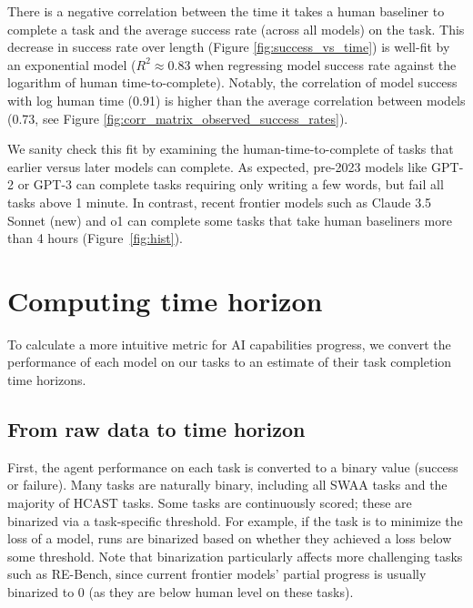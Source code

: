 \documentclass{article}
\newcommand{\gabenchmark}{HCAST}
\begin{document}
There is a negative correlation between the time it takes a human baseliner to complete a task and the average success rate (across all models) on the task. This decrease in success rate over length (Figure \ref{fig:success_vs_time}) is well-fit by an exponential model ($R^2 \approx 0.83$ when regressing model success rate against the logarithm of human time-to-complete). Notably, the correlation of model success with log human time (0.91) is higher than the average correlation between models (0.73, see Figure \ref{fig:corr_matrix_observed_success_rates}). 

We sanity check this fit by examining the human-time-to-complete of tasks that earlier versus later models can complete. As expected, pre-2023 models like GPT-2 or GPT-3 can complete tasks requiring only writing a few words, but fail all tasks above 1 minute. In contrast, recent frontier models such as Claude 3.5 Sonnet (new) and o1 can complete some tasks that take human baseliners more than 4 hours (Figure~\ref{fig:hist}). 



\section{Computing time horizon} \label{sec:converting-to-horizon}
To calculate a more intuitive metric for AI capabilities progress, we convert the performance of each model on our tasks to an estimate of their task completion time horizons. 

\subsection{From raw data to time horizon} \label{sec:model_horizon_length}

First, the agent performance on each task is converted to a binary value (success or failure).  Many tasks are naturally binary, including all SWAA tasks and the majority of \gabenchmark{} tasks. Some tasks are continuously scored; these are binarized via a task-specific threshold. For example, if the task is to minimize the loss of a model, runs are binarized based on whether they achieved a loss below some threshold. Note that binarization particularly affects more challenging tasks such as RE-Bench, since current frontier models' partial progress is usually binarized to 0 (as they are below human level on these tasks).
\end{document}
